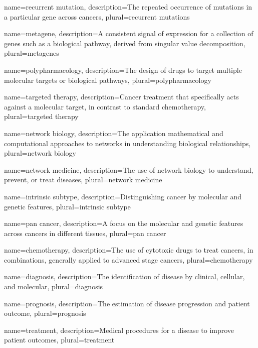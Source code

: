 {
  name=recurrent mutation,
  description={The repeated occurrence of mutations in a particular gene across cancers},
  plural=recurrent mutations
}

{
  name=metagene,
  description={A consistent signal of expression for a collection of genes such as a biological pathway, derived from singular value decomposition},
  plural=metagenes
}

{
  name=polypharmacology,
  description={The design of drugs to target multiple molecular targets or biological pathways},
  plural=polypharmacology
}

{
  name=targeted therapy,
  description={Cancer treatment that specifically acts against a molecular target, in contrast to standard chemotherapy},
  plural=targeted therapy
}

{
  name=network biology,
  description={The application mathematical and computational approaches to networks in understanding biological relationships},
  plural=network biology
}

{
  name=network medicine,
  description={The use  of \gls{network biology} to understand, prevent, or treat diseases},
  plural=network medicine
}

{
  name=intrinsic subtype,
  description={Distinguishing cancer by molecular and genetic features},
  plural=intrinsic subtype
}


{
  name=pan cancer,
  description={A focus on the molecular and genetic features across cancers in different tissues},
  plural=pan cancer
}


{
  name=chemotherapy,
  description={The use of cytotoxic drugs to treat cancers, in combinations, generally applied to advanced stage cancers},
  plural=chemotherapy
}


{
  name=diagnosis,
  description={The identification of disease by clinical, cellular, and molecular},
  plural=diagnosis
}


{
  name=prognosis,
  description={The estimation of disease progression and patient outcome},
  plural=prognosis
}


{
  name=treatment,
  description={Medical procedures for a disease to improve patient outcomes},
  plural=treatment
}


